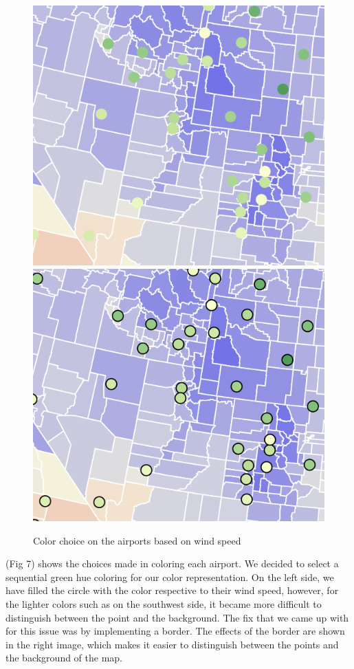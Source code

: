 \documentclass[10pt,twocolumn,twoside]{opticajnl}
\begin{document}
\begin{figure}
    \centering
    \includegraphics[scale=0.45]{images/img5.png}
    \includegraphics[scale=0.45]{images/img4.png}
    \caption{Color choice on the airports based on wind speed}
\end{figure}

(Fig 7) shows the choices made in coloring each airport. We decided to select a sequential green hue coloring for our color representation. On the left side, we have filled the circle with the color respective to their wind speed, however, for the lighter colors such as on the southwest side, it became more difficult to distinguish between the point and the background. The fix that we came up with for this issue was by implementing a border. The effects of the border are shown in the right image, which makes it easier to distinguish between the points and the background of the map.
\end{document}
